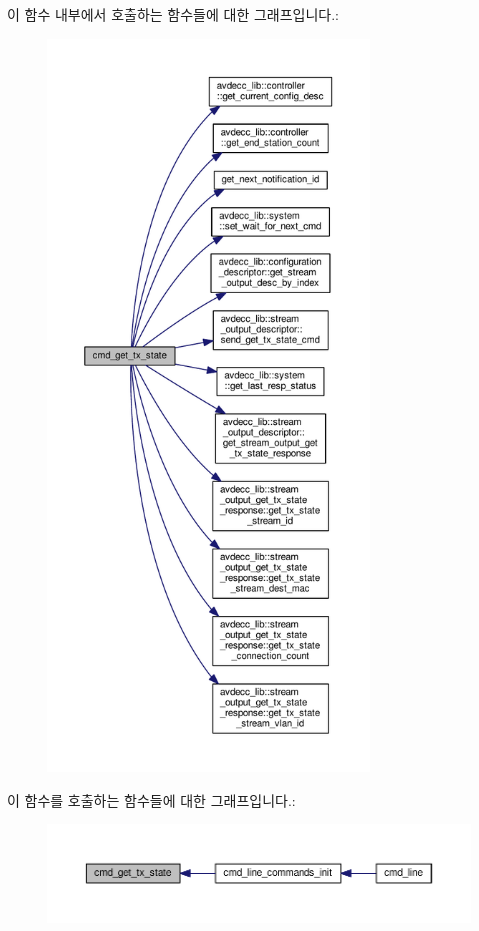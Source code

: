 이 함수 내부에서 호출하는 함수들에 대한 그래프입니다.\+:
\nopagebreak
\begin{figure}[H]
\begin{center}
\leavevmode
\includegraphics[height=550pt]{classcmd__line_a9537b40689b6ca147bd4fb615cb3ee68_cgraph}
\end{center}
\end{figure}




이 함수를 호출하는 함수들에 대한 그래프입니다.\+:
\nopagebreak
\begin{figure}[H]
\begin{center}
\leavevmode
\includegraphics[width=350pt]{classcmd__line_a9537b40689b6ca147bd4fb615cb3ee68_icgraph}
\end{center}
\end{figure}


